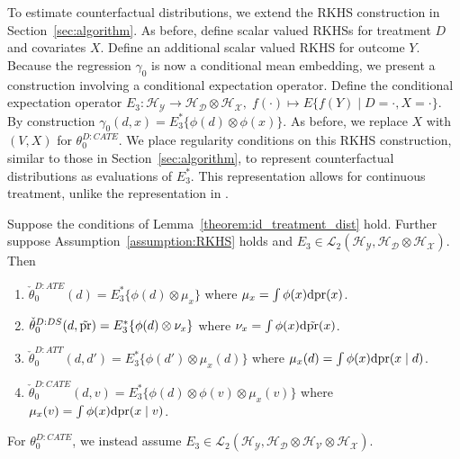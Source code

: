 To estimate counterfactual distributions, we extend the RKHS construction in Section~\ref{sec:algorithm}. As before, define scalar valued RKHSs for treatment $D$ and covariates $X$. Define an additional scalar valued RKHS for outcome $Y$. Because the regression $\gamma_0$ is now a conditional mean embedding, we present a construction involving a conditional expectation operator. Define the conditional expectation operator
$
E_3:\mathcal{H}_{\mathcal{Y}}\rightarrow \mathcal{H}_{\mathcal{D}}\otimes \mathcal{H}_{\mathcal{X}},\; f(\cdot)\mapsto E\{f(Y) \mid D=\cdot,X=\cdot \}
$. By construction
$
\gamma_0(d,x)=E_3^*\{\phi(d)\otimes \phi(x)\}
$.  As before, we replace $X$ with $(V,X)$ for $\theta_0^{D:CATE}$. We place regularity conditions on this RKHS construction, similar to those in Section~\ref{sec:algorithm}, to represent counterfactual distributions as evaluations of $E_3^*$. This representation allows for continuous treatment, unlike the representation in \cite[eq. 16, 17, 20]{muandet2021counterfactual}.

\begin{theorem}\label{theorem:representation_dist}
Suppose the conditions of Lemma~\ref{theorem:id_treatment_dist} hold. Further suppose Assumption~\ref{assumption:RKHS} holds and $E_3\in\mathcal{L}_2(\mathcal{H}_{\mathcal{Y}},\mathcal{H}_{\mathcal{D}}\otimes \mathcal{H}_{\mathcal{X}})$. Then
\begin{enumerate}
    \item $\check{\theta}_0^{D:ATE}(d)=E_3^*\{\phi(d)\otimes \mu_x\} $ where $\mu_x=\int\phi(x) \mathrm{d}\text{\normalfont pr}(x) $.
    \item $\check{\theta}_0^{D:DS}(d,\tilde{\text{\normalfont pr}})=E_3^*\{\phi(d)\otimes \nu_x\}$ where $\nu_x=\int\phi(x) \mathrm{d}\tilde{\text{\normalfont pr}}(x) $.
    \item $\check{\theta}_0^{D:ATT}(d,d')=E_3^*\{\phi(d')\otimes \mu_x(d)\} $  where $\mu_x(d)=\int\phi(x) \mathrm{d}\text{\normalfont pr}(x \mid d)$.
    \item $\check{\theta}_0^{D:CATE}(d,v)=E_3^*\{\phi(d)\otimes \phi(v)\otimes \mu_{x}(v)\}$ where $\mu_{x}(v)= \int \phi(x) \mathrm{d}\text{\normalfont pr}(x \mid v)$.
\end{enumerate}
For $\theta_0^{D:CATE}$, we instead assume $E_3\in\mathcal{L}_2(\mathcal{H}_{\mathcal{Y}},\mathcal{H}_{\mathcal{D}}\otimes\mathcal{H}_{\mathcal{V}} \otimes  \mathcal{H}_{\mathcal{X}})$.
\end{theorem}


